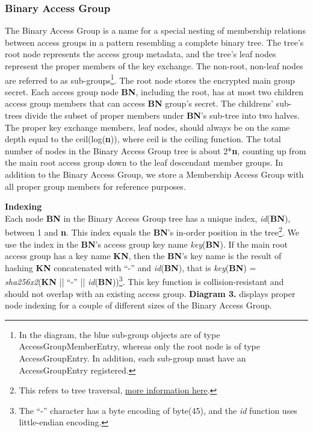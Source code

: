 \documentclass[oneside, 12pt]{article}
\newcommand{\fn}[1]{\footnote{\hangpara{1.4em}{1} #1}}
\begin{document}
\subsubsection{\textbf{Binary Access Group}}
The Binary Access Group is a name for a special nesting of membership relations between access groups in a pattern resembling a complete binary tree. The tree's root node represents the access group metadata, and the tree's leaf nodes represent the proper members of the key exchange. The non-root, non-leaf nodes are referred to as sub-groups\fn{In the diagram, the blue sub-group objects are of type AccessGroupMemberEntry, whereas only the root node is of type AccessGroupEntry. In addition, each sub-group must have an AccessGroupEntry registered.}. The root node stores the encrypted main group secret. Each access group node \textbf{BN}, including the root, has at most two children access group members that can access \textbf{BN} group’s secret. The childrens’ sub-trees divide the subset of proper members under \textbf{BN}’s sub-tree into two halves. The proper key exchange members, leaf nodes, should always be on the same depth equal to the ceil(log(\textbf{n})), where ceil is the ceiling function. The total number of nodes in the Binary Access Group tree is about 2*\textbf{n}, counting up from the main root access group down to the leaf descendant member groups. In addition to the Binary Access Group, we store a Membership Access Group with all proper group members for reference purposes.\newpage

\noindent\textbf{Indexing}\\
\noindent Each node \textbf{BN} in the Binary Access Group tree has a unique index, \textit{id}(\textbf{BN}), between 1 and \textbf{n}. This index equals the \textbf{BN}’s in-order position in the tree\fn{This refers to tree traversal, \href{https://en.wikipedia.org/wiki/Tree_traversal}{more information here}.}. We use the index in the \textbf{BN}’s access group key name \textit{key}(\textbf{BN}). If the main root access group has a key name \textbf{KN}, then the \textbf{BN}’s key name is the result of hashing \textbf{KN} concatenated with “-” and \textit{id}(\textbf{BN}), that is \textit{key}(\textbf{BN}) = \textit{sha256x2}(\textbf{KN} || “-” || \textit{id}(\textbf{BN}))\fn{The “-” character has a byte encoding of byte(45), and the \textit{id} function uses little-endian encoding.}. This key function is collision-resistant and should not overlap with an existing access group. \textbf{Diagram 3.} displays proper node indexing for a couple of different sizes of the Binary Access Group.\\
\end{document}
